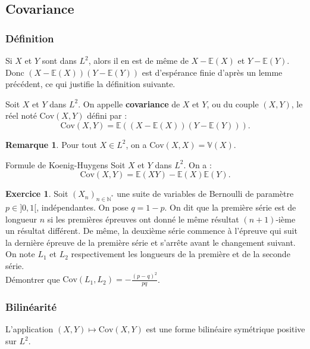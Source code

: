 \documentclass[french]{article}
\newcommand{\N}{\mathbb{N}}
\newcommand{\st}{^*}
\newcommand{\E}{\mathbb{E}}
\newcommand{\V}{\mathbb{V}}
\theoremstyle{plain}
\theoremstyle{definition}
\newtheorem{exo}{Exercice}
\newtheorem*{rmq}{Remarque}
\theoremstyle{remark}
\begin{document}
\subsection{Covariance}

\subsubsection*{Définition}

Si $X$ et $Y$ sont dans $L^2$, alors il en est de même de $X-\E(X)$ et $Y-\E(Y)$. Donc $(X-\E(X))(Y-\E(Y))$ est d'espérance finie d'après un lemme précédent, ce qui justifie la définition suivante.

\begin{dfn}
	Soit $X$ et $Y$ dans $L^2$. On appelle \textbf{covariance} de $X$ et $Y$, ou du couple $(X,Y)$, le réel noté $\text{Cov}(X,Y)$ défini par : $$\text{Cov}(X,Y)=\E((X-\E(X))(Y-\E(Y))).$$
\end{dfn}

\begin{rmq}
	Pour tout $X\in L^2$, on a $\text{Cov}(X,X)=\V(X)$.
\end{rmq}

\begin{thm}{Formule de Koenig-Huygens}
	Soit $X$ et $Y$ dans $L^2$. On a : $$\text{Cov}(X,Y)=\E(XY)-\E(X)\E(Y).$$
\end{thm}

\begin{exo}
	Soit $(X_n)_{n\in\N\st}$ une suite de variables de Bernoulli de paramètre $p\in]0,1[$, indépendantes. On pose $q=1-p$. On dit que la première série est de longueur $n$ si les premières épreuves ont donné le même résultat $(n+1)$-ième un résultat différent. De même, la deuxième série commence à l'épreuve qui suit la dernière épreuve de la première série et s'arrête avant le changement suivant. On note $L_1$ et $L_2$ respectivement les longueurs de la première et de la seconde série.\\
	Démontrer que $\text{Cov}(L_1,L_2)=\displaystyle -\frac{(p-q)^2}{pq}$.
\end{exo}

\subsubsection*{Bilinéarité}

\begin{thm}{}%
	L'application $(X,Y)\mapsto\text{Cov}(X,Y)$ est une forme bilinéaire symétrique positive sur $L^2$.
\end{thm}
\end{document}

